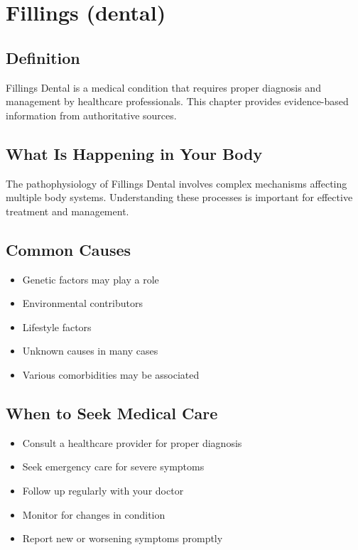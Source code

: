 
\chapter{Fillings (dental)}

\section*{Definition}
Fillings Dental is a medical condition that requires proper diagnosis and management by healthcare professionals. This chapter provides evidence-based information from authoritative sources.

\section*{What Is Happening in Your Body}
The pathophysiology of Fillings Dental involves complex mechanisms affecting multiple body systems. Understanding these processes is important for effective treatment and management.

\section*{Common Causes}
\begin{itemize}
  \item Genetic factors may play a role
  \item Environmental contributors
  \item Lifestyle factors
  \item Unknown causes in many cases
  \item Various comorbidities may be associated
\end{itemize}

\section*{When to Seek Medical Care}
\begin{itemize}
  \item Consult a healthcare provider for proper diagnosis
  \item Seek emergency care for severe symptoms
  \item Follow up regularly with your doctor
  \item Monitor for changes in condition
  \item Report new or worsening symptoms promptly
\end{itemize}

